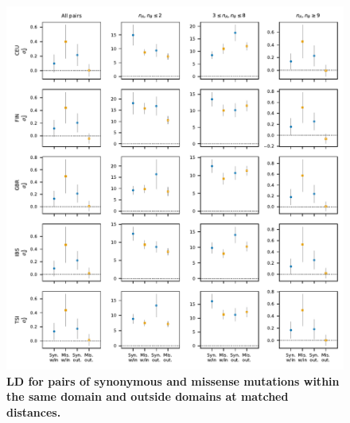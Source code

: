 \documentclass[]{article}
\begin{document}
\begin{figure}[ht!]
    \centering
    \includegraphics{../figures/data_domains_eur}
    \caption{
        \textbf{LD for pairs of synonymous and missense mutations within the
        same domain and outside domains at matched distances.}
    }
    \label{fig:domainsEUR}
\end{figure}
\end{document}
